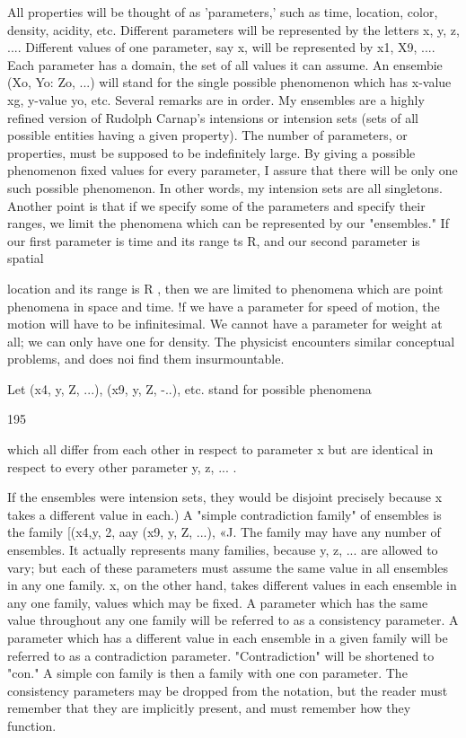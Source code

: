\documentclass[10pt,twoside]{memoir}
\begin{document}
\begin{enumerate}
{\begin{enumerate}
\begin{sysrules}
\begin{sysrules}
\begin{sysrules}
\begin{sysrules}
{\begin{enumerate}
{{{{{{{{{All properties will be thought of as 'parameters,' such as time, 
location, color, density, acidity, etc. Different parameters will be represented 
by the letters x, y, z, .... Different values of one parameter, say x, will be 
represented by x1, X9, .... Each parameter has a domain, the set of all values 
it can assume. An ensembie (Xo, Yo: Zo, ...) will stand for the single possible 
phenomenon which has x-value xg, y-value yo, etc. Several remarks are in 
order. My ensembles are a highly refined version of Rudolph Carnap's 
intensions or intension sets (sets of all possible entities having a given 
property). The number of parameters, or properties, must be supposed to be 
indefinitely large. By giving a possible phenomenon fixed values for every 
parameter, I assure that there will be only one such possible phenomenon. In 
other words, my intension sets are all singletons. Another point is that if we 
specify some of the parameters and specify their ranges, we limit the 
phenomena which can be represented by our "ensembles." If our first 
parameter is time and its range ts R, and our second parameter is spatial 


location and its range is R , then we are limited to phenomena which are 
point phenomena in space and time. !f we have a parameter for speed of 
motion, the motion will have to be infinitesimal. We cannot have a 
parameter for weight at all; we can only have one for density. The physicist 
encounters similar conceptual problems, and does noi find them 
insurmountable. 

Let (x4, y, Z, ...), (x9, y, Z, -..), etc. stand for possible phenomena 


195 


which all differ from each other in respect to parameter x but are identical in 
respect to every other parameter y, z, ... . {If the ensembles were intension 
sets, they would be disjoint precisely because x takes a different value in 
each.) A "simple contradiction family" of ensembles is the family [(x4,y, 2, 
aay (x9, y, Z, ...), «J. The family may have any number of ensembles. It 
actually represents many families, because y, z, ... are allowed to vary; but 
each of these parameters must assume the same value in all ensembles in any 
one family. x, on the other hand, takes different values in each ensemble in 
any one family, values which may be fixed. A parameter which has the same 
value throughout any one family will be referred to as a consistency 
parameter. A parameter which has a different value in each ensemble in a 
given family will be referred to as a contradiction parameter. 
"Contradiction" will be shortened to "con." A simple con family is then a 
family with one con parameter. The consistency parameters may be dropped 
from the notation, but the reader must remember that they are implicitly 
present, and must remember how they function. 

}}}}}}}}}}
\end{enumerate}}
\end{sysrules}
\end{sysrules}
\end{sysrules}
\end{sysrules}
\end{enumerate}}
\end{enumerate}
\end{document}
